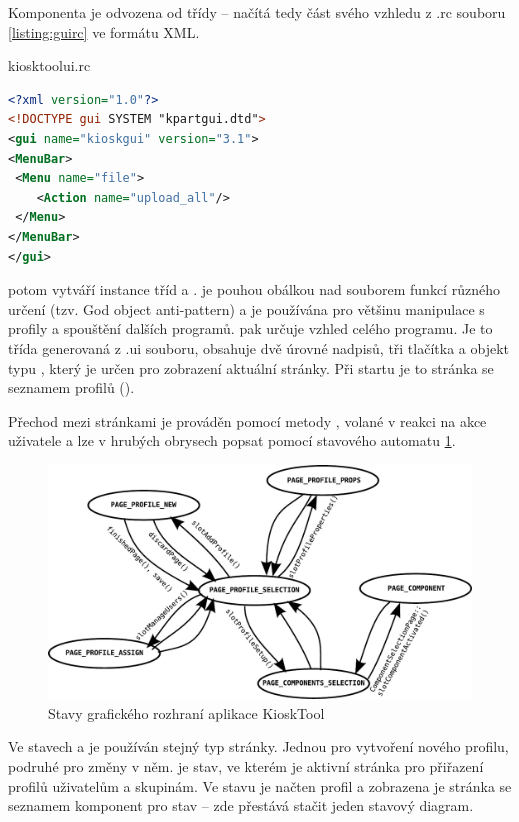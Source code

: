 {Komponenta  je odvozena od třídy  -- načítá tedy část svého vzhledu z .rc souboru \ref{listing:guirc} ve formátu XML.
\begin{mylisting}
\caption{kiosktoolui.rc}
\label{listing:guirc}
\begin{lstlisting}[language=XML]
<?xml version="1.0"?>
<!DOCTYPE gui SYSTEM "kpartgui.dtd">
<gui name="kioskgui" version="3.1">
<MenuBar>
 <Menu name="file">
    <Action name="upload_all"/>
 </Menu>
</MenuBar>
</gui>
\end{lstlisting}
\end{mylisting}

 potom vytváří instance tříd  a .  je pouhou obálkou nad souborem funkcí různého určení (tzv. God object anti-pattern) a je používána pro většinu manipulace s profily a spouštění dalších programů.  pak určuje vzhled celého programu. Je to třída generovaná z .ui souboru, obsahuje dvě úrovné nadpisů, tři tlačítka a objekt typu , který je určen pro zobrazení aktuální stránky. Při startu je to stránka se seznamem profilů ().

Přechod mezi stránkami je prováděn pomocí metody , volané v reakci na akce uživatele a lze v hrubých obrysech popsat pomocí stavového automatu \ref{fig:kioskstates}.

\begin{figure}[h]
    \centering
    \includegraphics[width=13cm]{obrazky/stated.pdf}
    \caption{Stavy grafického rozhraní aplikace KioskTool}
    \label{fig:kioskstates}
\end{figure}

Ve stavech  a  je používán stejný typ stránky. Jednou pro vytvoření nového profilu, podruhé pro změny v něm.\linebreak {} je stav, ve kterém je aktivní stránka pro přiřazení profilů uživatelům a skupinám. Ve stavu  je načten profil a zobrazena je stránka se seznamem komponent pro stav  -- zde přestává stačit jeden stavový diagram.

}
